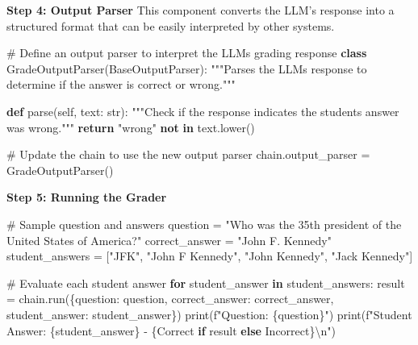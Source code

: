 \documentclass[
]{agujournal2019}
\newenvironment{Shaded}{\begin{snugshade}}{\end{snugshade}}
\newcommand{\BuiltInTok}[1]{\textcolor[rgb]{0.00,0.23,0.31}{#1}}
\newcommand{\CharTok}[1]{\textcolor[rgb]{0.13,0.47,0.30}{#1}}
\newcommand{\CommentTok}[1]{\textcolor[rgb]{0.37,0.37,0.37}{#1}}
\newcommand{\ControlFlowTok}[1]{\textcolor[rgb]{0.00,0.23,0.31}{\textbf{#1}}}
\newcommand{\KeywordTok}[1]{\textcolor[rgb]{0.00,0.23,0.31}{\textbf{#1}}}
\newcommand{\NormalTok}[1]{\textcolor[rgb]{0.00,0.23,0.31}{#1}}
\newcommand{\OperatorTok}[1]{\textcolor[rgb]{0.37,0.37,0.37}{#1}}
\newcommand{\SpecialCharTok}[1]{\textcolor[rgb]{0.37,0.37,0.37}{#1}}
\newcommand{\SpecialStringTok}[1]{\textcolor[rgb]{0.13,0.47,0.30}{#1}}
\newcommand{\StringTok}[1]{\textcolor[rgb]{0.13,0.47,0.30}{#1}}
\newcommand{\VariableTok}[1]{\textcolor[rgb]{0.07,0.07,0.07}{#1}}
\begin{document}
\textbf{Step 4: Output Parser} This component converts the LLM's
response into a structured format that can be easily interpreted by
other systems.

\begin{Shaded}
\begin{Highlighting}[]
\CommentTok{\# Define an output parser to interpret the LLM\textquotesingle{}s grading response}
\KeywordTok{class}\NormalTok{ GradeOutputParser(BaseOutputParser):}
    \CommentTok{"""Parses the LLM\textquotesingle{}s response to determine if the answer is correct or wrong."""}
    
    \KeywordTok{def}\NormalTok{ parse(}\VariableTok{self}\NormalTok{, text: }\BuiltInTok{str}\NormalTok{):}
        \CommentTok{"""Check if the response indicates the student\textquotesingle{}s answer was wrong."""}
        \ControlFlowTok{return} \StringTok{"wrong"} \KeywordTok{not} \KeywordTok{in}\NormalTok{ text.lower()}

\CommentTok{\# Update the chain to use the new output parser}
\NormalTok{chain.output\_parser }\OperatorTok{=}\NormalTok{ GradeOutputParser()}
\end{Highlighting}
\end{Shaded}

\textbf{Step 5: Running the Grader}

\begin{Shaded}
\begin{Highlighting}[]
\CommentTok{\# Sample question and answers}
\NormalTok{question }\OperatorTok{=} \StringTok{"Who was the 35th president of the United States of America?"}
\NormalTok{correct\_answer }\OperatorTok{=} \StringTok{"John F. Kennedy"}
\NormalTok{student\_answers }\OperatorTok{=}\NormalTok{ [}\StringTok{"JFK"}\NormalTok{, }\StringTok{"John F Kennedy"}\NormalTok{, }\StringTok{"John Kennedy"}\NormalTok{, }\StringTok{"Jack Kennedy"}\NormalTok{]}

\CommentTok{\# Evaluate each student answer}
\ControlFlowTok{for}\NormalTok{ student\_answer }\KeywordTok{in}\NormalTok{ student\_answers:}
\NormalTok{    result }\OperatorTok{=}\NormalTok{ chain.run(\{}\StringTok{\textquotesingle{}question\textquotesingle{}}\NormalTok{: question, }\StringTok{\textquotesingle{}correct\_answer\textquotesingle{}}\NormalTok{: correct\_answer, }\StringTok{\textquotesingle{}student\_answer\textquotesingle{}}\NormalTok{: student\_answer\})}
    \BuiltInTok{print}\NormalTok{(}\SpecialStringTok{f"Question: }\SpecialCharTok{\{}\NormalTok{question}\SpecialCharTok{\}}\SpecialStringTok{"}\NormalTok{)}
    \BuiltInTok{print}\NormalTok{(}\SpecialStringTok{f"Student Answer: }\SpecialCharTok{\{}\NormalTok{student\_answer}\SpecialCharTok{\}}\SpecialStringTok{ {-} }\SpecialCharTok{\{}\StringTok{\textquotesingle{}Correct\textquotesingle{}} \ControlFlowTok{if}\NormalTok{ result }\ControlFlowTok{else} \StringTok{\textquotesingle{}Incorrect\textquotesingle{}}\SpecialCharTok{\}}\CharTok{\textbackslash{}n}\SpecialStringTok{"}\NormalTok{)}
\end{Highlighting}
\end{Shaded}
\end{document}

